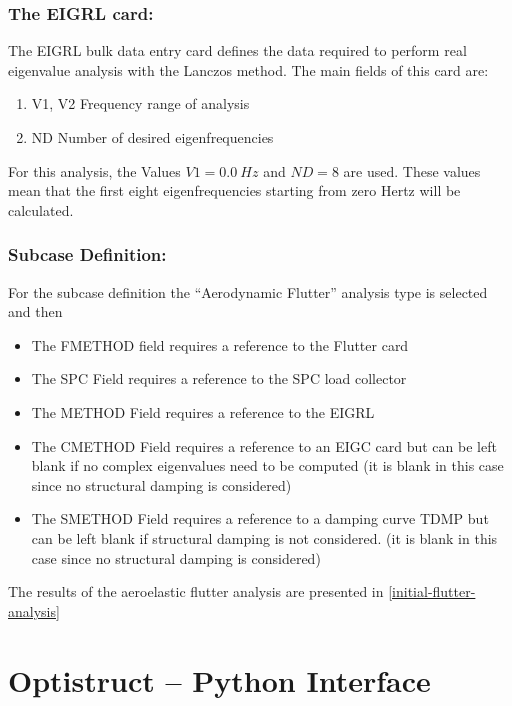 \subsubsection{The EIGRL card:}

The EIGRL bulk data entry card defines the data required to perform real
eigenvalue analysis with the Lanczos method. The main fields of this
card are:

\begin{enumerate}
\def\labelenumi{\arabic{enumi}.}
\item
  V1, V2 Frequency range of analysis
\item
  ND Number of desired eigenfrequencies
\end{enumerate}

For this analysis, the Values \(V1 = 0.0\ Hz\) and \(ND = 8\) are used.
These values mean that the first eight eigenfrequencies starting from
zero Hertz will be calculated.

\subsubsection{Subcase Definition:}

For the subcase definition the ``Aerodynamic Flutter'' analysis type is
selected and then

\begin{itemize}
\item
  The FMETHOD field requires a reference to the Flutter card
\item
  The SPC Field requires a reference to the SPC load collector
\item
  The METHOD Field requires a reference to the EIGRL
\item
  The CMETHOD Field requires a reference to an EIGC card but can be left
  blank if no complex eigenvalues need to be computed (it is blank in
  this case since no structural damping is considered)
\item
  The SMETHOD Field requires a reference to a damping curve TDMP but can
  be left blank if structural damping is not considered. (it is blank in
  this case since no structural damping is considered)
\end{itemize}

The results of the aeroelastic flutter analysis are presented in \autoref{initial-flutter-analysis} 

\section{Optistruct -- Python Interface}\label{optistruct-python-interface}

